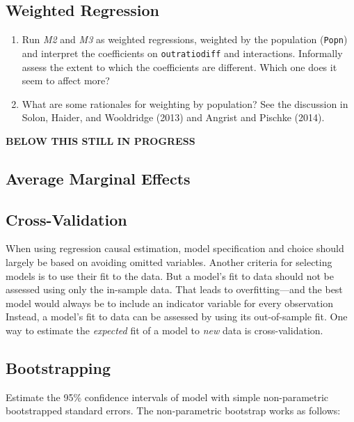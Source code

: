 \documentclass[]{article}
\providecommand{\tightlist}{%
  \setlength{\itemsep}{0pt}\setlength{\parskip}{0pt}}
\begin{document}
\subsection{Weighted Regression}\label{weighted-regression}

\begin{enumerate}
\def\labelenumi{\arabic{enumi}.}
\tightlist
\item
  Run \emph{M2} and \emph{M3} as weighted regressions, weighted by the
  population (\texttt{Popn}) and interpret the coefficients on
  \texttt{outratiodiff} and interactions. Informally assess the extent
  to which the coefficients are different. Which one does it seem to
  affect more?
\item
  What are some rationales for weighting by population? See the
  discussion in Solon, Haider, and Wooldridge (2013) and Angrist and
  Pischke (2014).
\end{enumerate}

\textbf{BELOW THIS STILL IN PROGRESS}

\subsection{Average Marginal Effects}\label{average-marginal-effects}

\subsection{Cross-Validation}\label{cross-validation}

When using regression causal estimation, model specification and choice
should largely be based on avoiding omitted variables. Another criteria
for selecting models is to use their fit to the data. But a model's fit
to data should not be assessed using only the in-sample data. That leads
to overfitting---and the best model would always be to include an
indicator variable for every observation Instead, a model's fit to data
can be assessed by using its out-of-sample fit. One way to estimate the
\emph{expected} fit of a model to \emph{new} data is cross-validation.

\subsection{Bootstrapping}\label{bootstrapping}

Estimate the 95\% confidence intervals of model with simple
non-parametric bootstrapped standard errors. The non-parametric
bootstrap works as follows:
\end{document}
